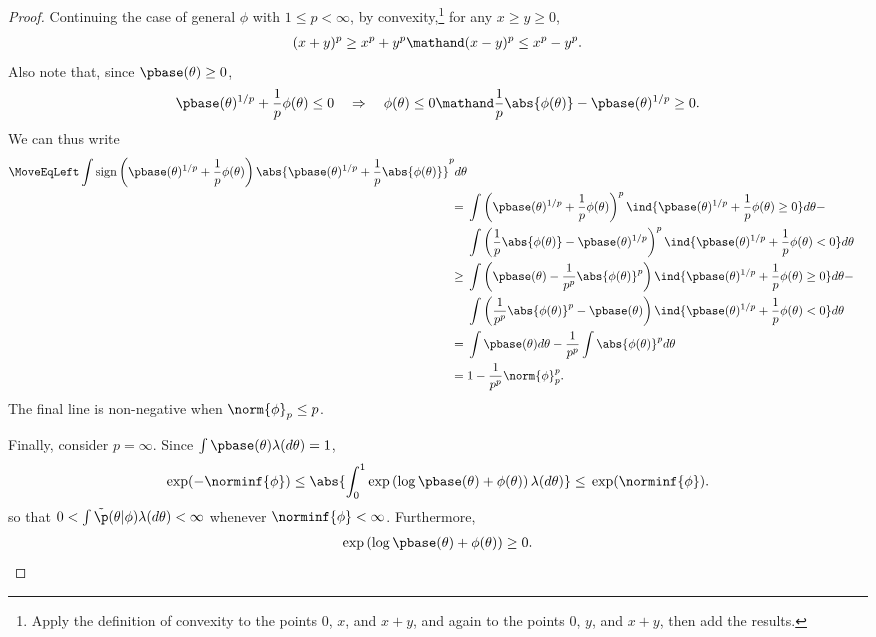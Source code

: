 \begin{proof}
Continuing the case of general $\phi$ with $1 \le p < \infty$, by
convexity,\footnote{Apply the definition of convexity to the points $0$, $x$,
and $x + y$, and again to the points $0$, $y$, and $x+y$, then add the results.}
for any $x \ge y \ge 0$,
%
\begin{align*}
%
(x + y)^p \ge{} x^p + y^p \mathand
(x - y)^p \le{} x^p - y^p.
%
\end{align*}
%
Also note that, since $\pbase(\theta) \ge 0$,
%
\begin{align*}
%
\pbase(\theta)^{1/p} + \frac{1}{p}\phi(\theta) \le 0
\quad\Rightarrow\quad
\phi(\theta) \le 0 \mathand
\frac{1}{p} \abs{\phi(\theta)} - \pbase(\theta)^{1/p} \ge 0.
%
\end{align*}
%
We can thus write
%
\begin{align*}
%
\MoveEqLeft
\int \mathrm{sign}\left(\pbase(\theta)^{1/p} + \frac{1}{p}\phi(\theta)\right)
    \abs{\pbase(\theta)^{1/p} + \frac{1}{p}\abs{\phi(\theta)}}^{p} d\theta
\\={}&
    \int \left(\pbase(\theta)^{1/p} + \frac{1}{p}\phi(\theta)\right)^{p}
        \ind{\pbase(\theta)^{1/p} + \frac{1}{p}\phi(\theta) \ge 0}
        d\theta - \\&
    \int \left(\frac{1}{p}\abs{\phi(\theta)} - \pbase(\theta)^{1/p}\right)^{p}
        \ind{\pbase(\theta)^{1/p} + \frac{1}{p}\phi(\theta) < 0}
        d\theta
\\\ge{}&
    \int \left(\pbase(\theta) - \frac{1}{p^p}\abs{\phi(\theta)}^{p}\right)
        \ind{\pbase(\theta)^{1/p} + \frac{1}{p}\phi(\theta) \ge 0}
        d\theta - \\&
    \int \left(\frac{1}{p^p}\abs{\phi(\theta)}^p - \pbase(\theta)\right)
        \ind{\pbase(\theta)^{1/p} + \frac{1}{p}\phi(\theta) < 0}
        d\theta
\\={}&
    \int \pbase(\theta) d\theta - \frac{1}{p^p}\int \abs{\phi(\theta)}^p d\theta
\\={}&
    1 - \frac{1}{p^p} \norm{\phi}_p^p.
%
\end{align*}
%
The final line is non-negative when $\norm{\phi}_p \le p$.





Finally, consider $p = \infty$.  Since $\int \pbase(\theta) \lambda(d\theta) = 1$,
%
\begin{align*}
%
\exp(-\norminf{\phi}) \le{}
\abs{\int_0^1 \exp\left(\log \pbase(\theta) + \phi(\theta)\right) \lambda(d\theta)}
\le{}
\exp(\norminf{\phi}).
%
\end{align*}
%
so that $0 < \int \tilde{\p}(\theta \vert \phi) \lambda(d\theta) < \infty$
whenever $\norminf{\phi} < \infty$.  Furthermore,
%
\begin{align*}
%
\exp\left(\log \pbase(\theta) + \phi(\theta)\right) \ge 0.
%
\end{align*}
%
\end{proof}












